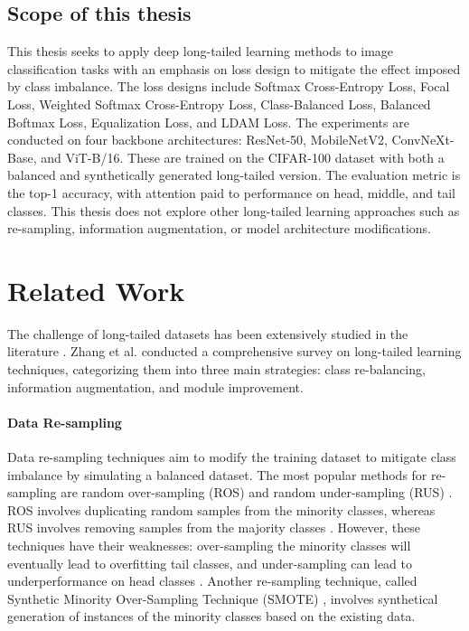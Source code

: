 \subsection{Scope of this thesis}
This thesis seeks to apply deep long-tailed learning methods to image classification tasks with an emphasis on loss design to mitigate the effect imposed by class imbalance. The loss designs include Softmax Cross-Entropy Loss, Focal Loss, Weighted Softmax Cross-Entropy Loss, Class-Balanced Loss, Balanced Boftmax Loss, Equalization Loss, and LDAM Loss. The experiments are conducted on four backbone architectures: ResNet-50, MobileNetV2, ConvNeXt-Base, and ViT-B/16. These are trained on the CIFAR-100 dataset with both a balanced and synthetically generated long-tailed version. The evaluation metric is the top-1 accuracy, with attention paid to performance on head, middle, and tail classes. This thesis does not explore other long-tailed learning approaches such as re-sampling, information augmentation, or model architecture modifications.




\section{Related Work}
The challenge of long-tailed datasets has been extensively studied in the literature \cite{zhang2023deep,zhang2024systematicreviewlongtailedlearning}. Zhang et al. \cite{zhang2023deep} conducted a comprehensive survey on long-tailed learning techniques, categorizing them into three main strategies: class re-balancing, information augmentation, and module improvement. 


\paragraph{Data Re-sampling}
Data re-sampling techniques aim to modify the training dataset to mitigate class imbalance by simulating a balanced dataset. The most popular methods for re-sampling are random over-sampling (ROS) and random under-sampling (RUS) \cite{Chawla_2002,han2005}. ROS involves duplicating random samples from the minority classes, whereas RUS involves removing samples from the majority classes \cite{zhang2023deep,han2005}. However, these techniques have their weaknesses: over-sampling the minority classes will eventually lead to overfitting tail classes, and under-sampling can lead to underperformance on head classes \cite{zhang2023deep}. Another re-sampling technique, called Synthetic Minority Over-Sampling Technique (SMOTE) \cite{Chawla_2002}, involves synthetical generation of instances of the minority classes based on the existing data. 

